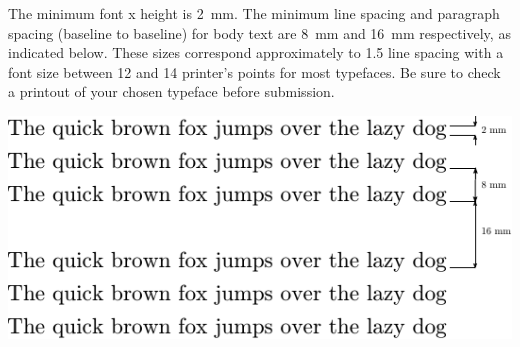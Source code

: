 \documentclass[a5paper, 10pt]{article}
\begin{document}
The minimum font x height is \SI{2}{mm}.  
The minimum line spacing and paragraph spacing (baseline to baseline) for body text are \SI{8}{mm} and \SI{16}{mm} respectively, as indicated below.  
These sizes correspond approximately to 1.5 line spacing with a font
size between 12 and 14 printer's points for most typefaces.  
Be sure to check a printout of your chosen typeface before submission.

\vspace{5em}

\includegraphics[width=\textwidth,clip=true,trim=5em 0 0 0]{fontsizes}




\end{document}
